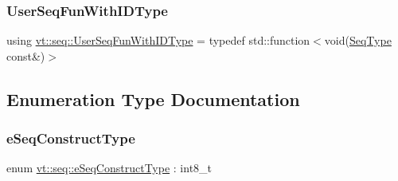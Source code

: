 \mbox{\label{namespacevt_1_1seq_a1a58d0ebe1d6bbed8438607a9c717779}} 
\subsubsection{\texorpdfstring{User\+Seq\+Fun\+With\+I\+D\+Type}{UserSeqFunWithIDType}}
{\footnotesize\ttfamily using \hyperlink{namespacevt_1_1seq_a1a58d0ebe1d6bbed8438607a9c717779}{vt\+::seq\+::\+User\+Seq\+Fun\+With\+I\+D\+Type} = typedef std\+::function$<$void(\hyperlink{namespacevt_1_1seq_a3b612da217ac669d39c159f134ab8434}{Seq\+Type} const\&)$>$}



\subsection{Enumeration Type Documentation}
\mbox{\label{namespacevt_1_1seq_a3041a01a5db2bccb3183e73b49e78252}} 
\subsubsection{\texorpdfstring{e\+Seq\+Construct\+Type}{eSeqConstructType}}
{\footnotesize\ttfamily enum \hyperlink{namespacevt_1_1seq_a3041a01a5db2bccb3183e73b49e78252}{vt\+::seq\+::e\+Seq\+Construct\+Type} \+: int8\+\_\+t\hspace{0.3cm}{\ttfamily [strong]}}

